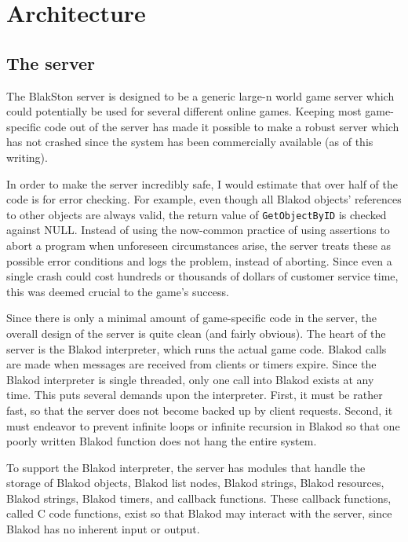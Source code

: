 
\chapter{Architecture}
\section{The server}

The BlakSton server is designed to be a generic large-n world game
server which could potentially be used for several different online
games.  Keeping most game-specific code out of the server has made it
possible to make a robust server which has not crashed since the
system has been commercially available (as of this writing).

In order to make the server incredibly safe, I would estimate that
over half of the code is for error checking.  For example, even though
all Blakod objects' references to other objects are always valid, the
return value of \texttt{GetObjectByID} is checked against NULL.
Instead of using the now-common practice of using assertions to abort
a program when unforeseen circumstances arise, the server treats these
as possible error conditions and logs the problem, instead of
aborting.  Since even a single crash could cost hundreds or thousands
of dollars of customer service time, this was deemed crucial to the
game's success.

Since there is only a minimal amount of game-specific code in the
server, the overall design of the server is quite clean (and fairly
obvious).  The heart of the server is the Blakod interpreter, which
runs the actual game code.  Blakod calls are made when messages are
received from clients or timers expire.  Since the Blakod interpreter
is single threaded, only one call into Blakod exists at any time.
This puts several demands upon the interpreter.  First, it must be
rather fast, so that the server does not become backed up by client
requests.  Second, it must endeavor to prevent infinite loops or
infinite recursion in Blakod so that one poorly written Blakod
function does not hang the entire system.

To support the Blakod interpreter, the server has modules that handle
the storage of Blakod objects, Blakod list nodes, Blakod strings,
Blakod resources, Blakod strings, Blakod timers, and callback
functions.  These callback functions, called C code functions, exist
so that Blakod may interact with the server, since Blakod has no
inherent input or output.

